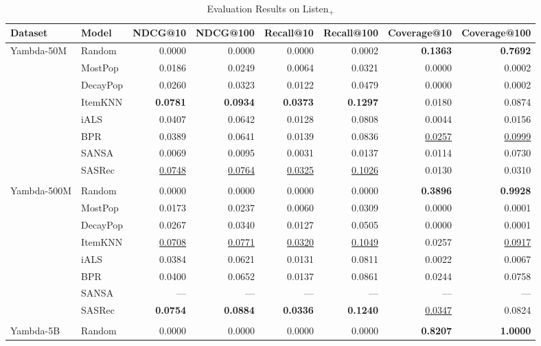 \documentclass[sigconf,authorversion,nonacm]{acmart}
\begin{document}
\begin{table}
  \caption{Evaluation Results on Listen$_{+}$}
  \label{tab:eval_le}
  \begin{tabular}{llrrrrrr}
    \toprule
    Dataset & Model & NDCG@10 & NDCG@100 & Recall@10 & Recall@100 & Coverage@10 & Coverage@100 \\
    \midrule
    Yambda-50M & Random & 0.0000 & 0.0000 & 0.0000 & 0.0002 & \textbf{0.1363} & \textbf{0.7692} \\
    & MostPop & 0.0186 & 0.0249 & 0.0064 & 0.0321 & 0.0000 & 0.0002 \\
    & DecayPop & 0.0260 & 0.0323 & 0.0122 & 0.0479 & 0.0000 & 0.0002 \\
    & ItemKNN & \textbf{0.0781} & \textbf{0.0934} & \textbf{0.0373} & \textbf{0.1297} & 0.0180 & 0.0874 \\
    & iALS & 0.0407 & 0.0642 & 0.0128 & 0.0808 & 0.0044 & 0.0156 \\
    & BPR & 0.0389 & 0.0641 & 0.0139 & 0.0836 & \underline{0.0257} & \underline{0.0999} \\
    & SANSA & 0.0069 & 0.0095 & 0.0031 & 0.0137 & 0.0114 & 0.0730 \\
    & SASRec & \underline{0.0748} & \underline{0.0764} & \underline{0.0325} & \underline{0.1026} & 0.0130 & 0.0310 \\
    \hline & \\[-2.2ex]
    Yambda-500M & Random & 0.0000 & 0.0000 & 0.0000 & 0.0000 & \textbf{0.3896} & \textbf{0.9928} \\
    & MostPop & 0.0173 & 0.0237 & 0.0060 & 0.0309 & 0.0000 & 0.0001 \\
    & DecayPop & 0.0267 & 0.0340 & 0.0127 & 0.0505 & 0.0000 & 0.0001 \\
    & ItemKNN & \underline{0.0708} & \underline{0.0771} & \underline{0.0320} & \underline{0.1049} & 0.0257 & \underline{0.0917} \\
    & iALS & 0.0384 & 0.0621 & 0.0131 & 0.0811 & 0.0022 & 0.0067 \\
    & BPR & 0.0400 & 0.0652 & 0.0137 & 0.0861 & 0.0244 & 0.0758 \\
    & SANSA & --- & --- & --- & --- & --- & --- \\
    & SASRec & \textbf{0.0754} & \textbf{0.0884} & \textbf{0.0336} & \textbf{0.1240} & \underline{0.0347} & 0.0824 \\
    \hline & \\[-2.2ex]
    Yambda-5B & Random & 0.0000 & 0.0000 & 0.0000 & 0.0000 & \textbf{0.8207} & \textbf{1.0000} \\

\end{tabular}
\end{table}
\end{document}
